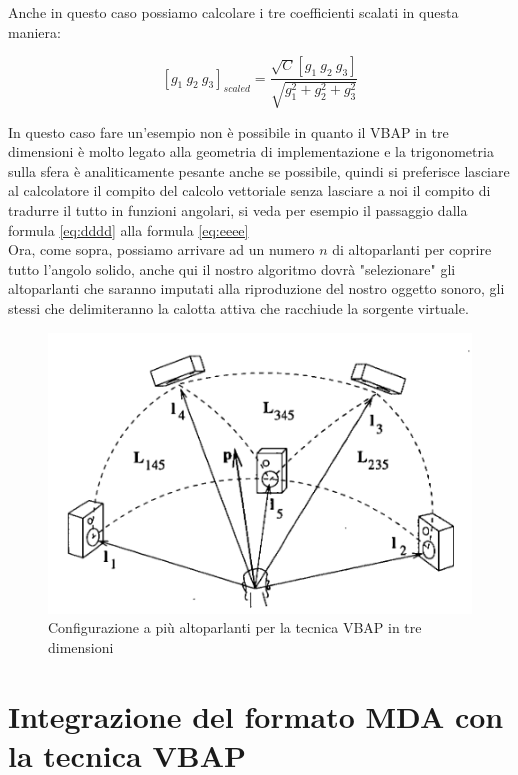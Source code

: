 \documentclass[12pt,a4paper]{report}
\begin{document}
Anche in questo caso possiamo calcolare i tre coefficienti scalati in questa maniera:

\begin{equation}
\left[g_1 \ g_2 \ g_3 \right]_{scaled} = \dfrac{\sqrt{C} \left[ g_1 \ g_2 \ g_3 \right]}{\sqrt{g_1^2 + g_2^2 + g_3^2}} 
\label{iiii}
\end{equation}

In questo caso fare un'esempio non è possibile in quanto il VBAP in tre dimensioni è molto legato alla geometria di implementazione e la trigonometria sulla sfera è analiticamente pesante anche se possibile, quindi si preferisce lasciare al calcolatore il compito del calcolo vettoriale senza lasciare a noi il compito di tradurre il tutto in funzioni angolari, si veda per esempio il passaggio dalla formula \ref{eq:dddd} alla formula \ref{eq:eeee}\\

Ora, come sopra, possiamo arrivare ad un numero $n$ di altoparlanti per coprire tutto l'angolo solido, anche qui il nostro algoritmo dovrà "selezionare" gli altoparlanti che saranno imputati alla riproduzione del nostro oggetto sonoro, gli stessi che delimiteranno la calotta attiva che racchiude la sorgente virtuale.

\begin{figure}[htbp]
	\centering
	\includegraphics[scale=0.50 ]{figures/matrix3dfull.png}
	\caption {Configurazione a più altoparlanti per la tecnica VBAP in tre dimensioni} 
	\label{fig:matrix3dfull}
	\end{figure}


\section{Integrazione del formato MDA con la tecnica VBAP}
\end{document}
